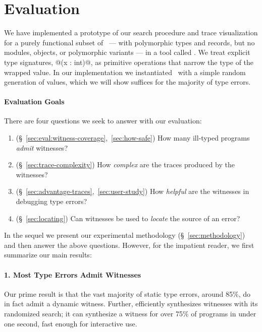 \section{Evaluation}
\label{sec:evaluation}

We have implemented a prototype of our search procedure and trace
visualization for a purely functional subset of \ocaml\ --- with
polymorphic types and records, but no modules, objects, or polymorphic
variants --- in a tool called \nanomaly.
%
We treat explicit type signatures, \eg @(x : int)@, as
primitive operations that narrow the type of the wrapped value.
%
In our implementation we instantiated \gensym\ with a simple random
generation of values, which we will show suffices for the majority of
type errors.

\paragraph{Evaluation Goals}
%
There are four questions we seek to answer with our evaluation:
%
\begin{enumerate}
\item {} (\S~\ref{sec:eval:witness-coverage},~\ref{sec:how-safe})
      How many ill-typed programs \emph{admit} witnesses?
\item {} (\S~\ref{sec:trace-complexity})
      How \emph{complex} are the traces produced by the witnesses?
\item {} (\S~\ref{sec:advantage-traces},~\ref{sec:user-study})
      How \emph{helpful} %
      are the witnesses in debugging type errors?
\item {} (\S~\ref{sec:locating})
      Can witnesses be used to \emph{locate} the source
      of an error?
\end{enumerate}

In the sequel we present our experimental methodology (\S~\ref{sec:methodology})
and then answer the above questions.
%
However, for the impatient reader, we first summarize our main results:

\paragraph{1. Most Type Errors Admit Witnesses}
Our prime result is that the vast majority of static type errors, around
85\%, do in fact admit a dynamic witness.
%
Further, \toolname efficiently synthesizes witnesses with its randomized search;
it can synthesize a witness for over 75\% of programs in under one second, \ie
fast enough for interactive use. %
%

